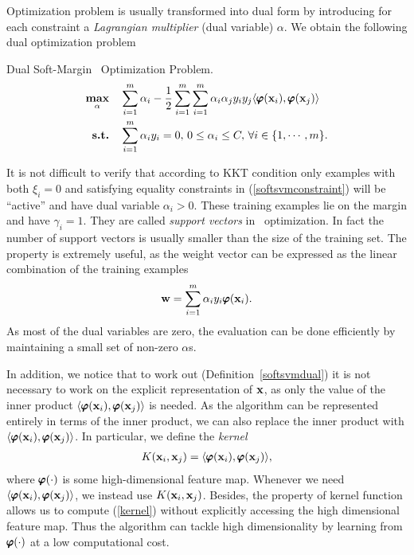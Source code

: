 {%
Optimization problem is usually transformed into dual form by introducing for each constraint a \textit{Lagrangian multiplier} (dual variable) $\alpha$.
We obtain the following dual optimization problem
\begin{definition}{Dual Soft-Margin \svm\ Optimization Problem.}\label{softsvmdual}
	\begin{align*}
		\underset{\mathbf {\alpha}}{\textbf{max}} & \quad\sum_{i=1}^{m}\alpha_i -\frac{1}{2}\sum_{i=1}^{m}\sum_{i=1}^{m}\alpha_i\alpha_jy_iy_j\langle \pmb \varphi(\mathbf {x}_i), \pmb \varphi(\mathbf {x}_j) \rangle\\
		\textbf{s.t.} & \quad \sum_{i=1}^{m}\alpha_iy_i=0, \, 0\le\alpha_i\le C, \, \forall i\in\{1,\cdots,m\}.
	\end{align*}
\end{definition}
It is not difficult to verify that according to KKT condition only examples with both $\xi_i=0$ and satisfying equality constraints in (\ref{softsvmconstraint}) will be ``active'' and have dual variable $\alpha_i>0$.
These training examples lie on the margin and have $\gamma_i=1$.
They are called \textit{support vectors} in \svm\ optimization.
In fact the number of support vectors is usually smaller than the size of the training set.
The property is extremely useful, as the weight vector can be expressed as the linear combination of the training examples
\begin{align*}
	\mathbf {w} = \sum_{i=1}^{m}\alpha_iy_i\pmb \varphi(\mathbf {x}_i).
\end{align*}
As most of the dual variables are zero, the evaluation can be done efficiently by maintaining a small set of non-zero $\alpha$s.

In addition, we notice that to work out (Definition~\ref{softsvmdual}) it is not necessary to work on the explicit representation of $\mathbf {x}$, as only the value of the inner product $\langle \pmb \varphi(\mathbf {x}_i), \pmb \varphi(\mathbf {x}_j) \rangle$ is needed.
As the algorithm can be represented entirely in terms of the inner product, we can also replace the inner product with $\langle \pmb \varphi(\mathbf {x}_i), \pmb \varphi(\mathbf {x}_j) \rangle$.
In particular, we define the \textit{kernel}
\begin{align}
	K(\mathbf {x}_i,\mathbf {x}_j) = \langle \pmb \varphi(\mathbf {x}_i), \pmb \varphi(\mathbf {x}_j) \rangle, \label{kernel}
\end{align}
where $\pmb \varphi(\cdot)$ is some high-dimensional feature map.
Whenever we need $\langle \pmb \varphi(\mathbf {x}_i), \pmb \varphi(\mathbf {x}_j) \rangle$, we instead use $K(\mathbf {x}_i,\mathbf {x}_j)$.
Besides, the property of kernel function \citep{Scholkopf02learning} allows us to compute (\ref{kernel}) without explicitly accessing the high dimensional feature map.
Thus the algorithm can tackle high dimensionality by learning from $\pmb \varphi(\cdot)$ at a low computational cost.

}
